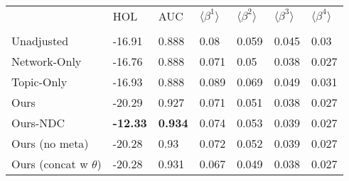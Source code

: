 \begin{tabular}{lllllll}
\toprule
{} &              HOL &             AUC & $\langle\beta^1\rangle$ & $\langle\beta^2\rangle$ & $\langle\beta^3\rangle$ & $\langle\beta^4\rangle$ \\
                         &                  &                 &                         &                         &                         &                         \\
\midrule
Unadjusted               &           -16.91 &           0.888 &                    0.08 &                   0.059 &                   0.045 &                    0.03 \\
Network-Only             &           -16.76 &           0.888 &                   0.071 &                    0.05 &                   0.038 &                   0.027 \\
Topic-Only               &           -16.93 &           0.888 &                   0.089 &                   0.069 &                   0.049 &                   0.031 \\
Ours                     &           -20.29 &           0.927 &                   0.071 &                   0.051 &                   0.038 &                   0.027 \\
Ours-NDC                 &  \textbf{-12.33} &  \textbf{0.934} &                   0.074 &                   0.053 &                   0.039 &                   0.027 \\
Ours (no meta)           &           -20.28 &            0.93 &                   0.072 &                   0.052 &                   0.039 &                   0.027 \\
Ours (concat w $\theta$) &           -20.28 &           0.931 &                   0.067 &                   0.049 &                   0.038 &                   0.027 \\
\bottomrule
\end{tabular}

